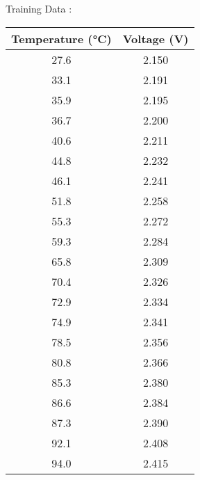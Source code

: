\documentclass[journal,12pt,onecolumn]{IEEEtran}
\author{EE25BTECH11018 , EE25BTECH11061}
\begin{document}
\maketitle
\begin{center}
Training Data : \\
\begin{tabular}{ |c|c| }
    \hline
    \textbf{Temperature (°C)} & \textbf{Voltage (V)} \\
    \hline
    27.6 & 2.150 \\
    \hline
    33.1 & 2.191 \\
    \hline
    35.9 & 2.195 \\
    \hline
    36.7 & 2.200 \\
    \hline
    40.6 & 2.211 \\
    \hline
    44.8 & 2.232 \\
    \hline
    46.1 & 2.241 \\
    \hline
    51.8 & 2.258 \\
    \hline
    55.3 & 2.272 \\
    \hline
    59.3 & 2.284 \\
    \hline
    65.8 & 2.309 \\
    \hline
    70.4 & 2.326 \\
    \hline
    72.9 & 2.334 \\
    \hline
    74.9 & 2.341 \\
    \hline
    78.5 & 2.356 \\
    \hline
    80.8 & 2.366 \\
    \hline
    85.3 & 2.380 \\
    \hline
    86.6 & 2.384 \\
    \hline
    87.3 & 2.390 \\
    \hline
    92.1 & 2.408 \\
    \hline
    94.0 & 2.415 \\
    \hline
\end{tabular}
\end{center}
\end{document}
